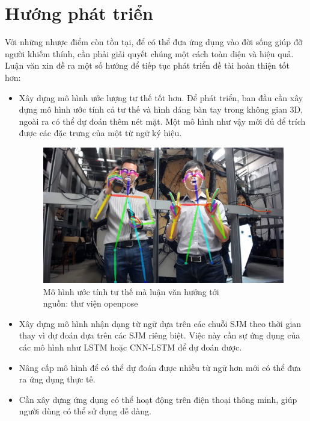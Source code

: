 \section{Hướng phát triển}
Với những nhược điểm còn tồn tại, để có thể đưa ứng dụng vào đời sống giúp đỡ người khiếm thính, cần phải giải quyết chúng một cách toàn diện và hiệu quả. Luận văn xin đề ra một số hướng để tiếp tục phát triển đề tài hoàn thiện tốt hơn:
\begin{itemize}
\item Xây dựng mô hình ước lượng tư thế tốt hơn. Để phát triển, ban đầu cần xây dựng mô hình ước tính cả tư thế và hình dáng bàn tay trong không gian 3D, ngoài ra có thể dự đoán thêm nét mặt. Một mô hình như vậy mới đủ để trích được các đặc trưng của một từ ngữ ký hiệu. 

\FloatBarrier
\begin{figure}[htp]
\begin{center}
\includegraphics[scale=0.3]{chap7/c7_figs/open_pose.jpg}
\end{center}
\caption{Mô hình ước tính tư thế mà luận văn hướng tới \\ nguồn: thư viện openpose}
\label{fig:openpose}
\end{figure}
\FloatBarrier

\item Xây dựng mô hình nhận dạng từ ngữ dựa trên các chuỗi SJM theo thời gian thay vì dự đoán dựa trên các SJM riêng biệt. Việc này cần sự ứng dụng của các mô hình như LSTM hoặc CNN-LSTM để dự đoán được.

\item Nâng cấp mô hình để có thể dự đoán được nhiều từ ngữ hơn mới có thể đưa ra ứng dụng thực tế.

\item Cần xây dựng ứng dụng có thể hoạt động trên điện thoại thông minh, giúp người dùng có thể sử dụng dễ dàng.

\end{itemize}
